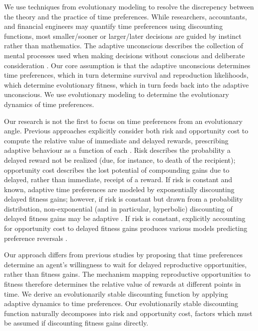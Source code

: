 \documentclass[titlepage, hidelinks, 12pt]{article}
\theoremstyle{plain}
\theoremstyle{remark}
\theoremstyle{definition}
\begin{document}
We use techniques from evolutionary modeling to resolve the discrepency between the theory and the practice of time preferences.
While researchers, accountants, and financial engineers may quantify time preferences using
discounting functions, most smaller/sooner or larger/later decisions are guided by instinct rather than mathematics. 
The adaptive unconscious describes the collection of mental processes used when making 
decisions without conscious and deliberate consideration \cite{wegner02}. 
Our core assumption is that 
the adaptive unconscious determines time preferences, which in turn determine survival and reproduction likelihoods, 
which determine evolutionary fitness, which in turn feeds back into the adaptive unconscious. 
We use evolutionary modeling to determine the evolutionary dynamics of time preferences. 


Our research is not the first to focus on time preferences from an evolutionary angle. Previous approaches explicitly consider both
risk and opportunity cost to compute the relative value of immediate and delayed rewards, prescribing adaptive behaviour as a function of
each \cite{sozou98, fawcett12}. Risk describes the probability a delayed reward not be realized (due, for instance, to death
of the recipient); opportunity cost 
describes the lost potential of compounding gains due to delayed, rather than immediate, receipt of a reward. 
If risk is constant and known, 
adaptive time preferences are modeled by exponentially discounting delayed fitness gains; however, if risk is constant but drawn
from a probability distribution, non-exponential (and in particular, hyperbolic) discounting of delayed fitness gains may be adaptive \cite{sozou98}. 
If risk is constant, explicitly accounting for opportunity
cost to delayed fitness gains produces various models predicting preference reversals \cite{fawcett12}. 

Our approach differs from previous studies by proposing that  
time preferences determine an agent's willingness to wait for delayed reproductive opportunities, rather than fitness gains. 
The mechanism mapping reproductive opportunities to fitness therefore determines the relative value of rewards at different points in time. 
We derive an evolutionarily stable discounting function by applying adaptive dynamics to time preferences. 
Our evolutionarily stable discounting function naturally decomposes into risk and opportunity cost, factors which
must be assumed if discounting fitness gains directly. 
\end{document}
